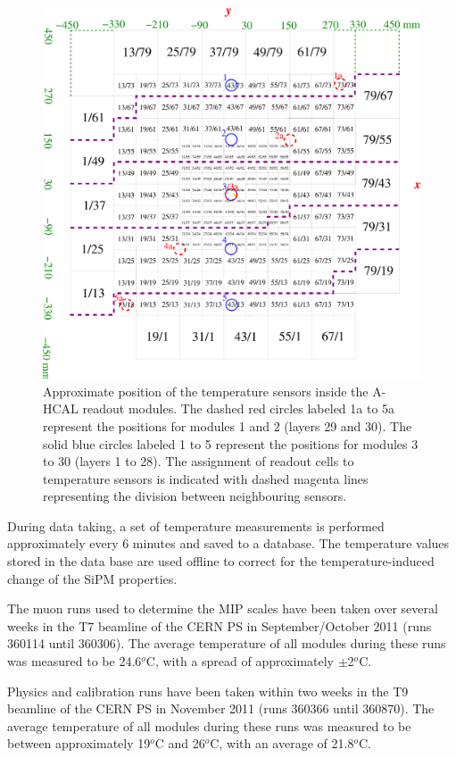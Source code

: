 \documentclass[a4paper,10pt]{article}
\begin{document}
\begin{figure}[t]
\label{sensor-config}
\centering
\includegraphics[width=15cm]{sensor-config.pdf}
\caption{Approximate position of the temperature sensors inside the A-HCAL readout modules. The dashed
red circles labeled 1a to 5a represent the positions for modules 1 and 2 (layers 29 and 30). The solid blue circles
labeled 1 to 5 represent the positions for modules 3 to 30 (layers 1 to 28). The assignment of readout cells
to temperature sensors is indicated with dashed magenta lines representing the division between neighbouring
sensors.}
\end{figure}

During data taking, a set of temperature measurements is performed approximately every 6 minutes and saved
to a database. The temperature values stored in the data base are used offline to correct for the 
temperature-induced change of the SiPM properties. 

The muon runs used to determine the MIP scales have been taken over several weeks in the 
T7 beamline of the CERN PS in September/October 2011 (runs 360114 until 360306). 
The average temperature of all modules during
 these runs was measured to be 24.6$^o$C, with a spread of approximately $\pm$2$^o$C.

Physics and calibration runs have been taken within 
two weeks in the T9 beamline of the CERN PS in November 2011 (runs 360366 until 360870).
 The average temperature of all modules during these runs was measured to be between 
approximately 19$^o$C and 26$^o$C, with an average of
21.8$^o$C.
\end{document}
